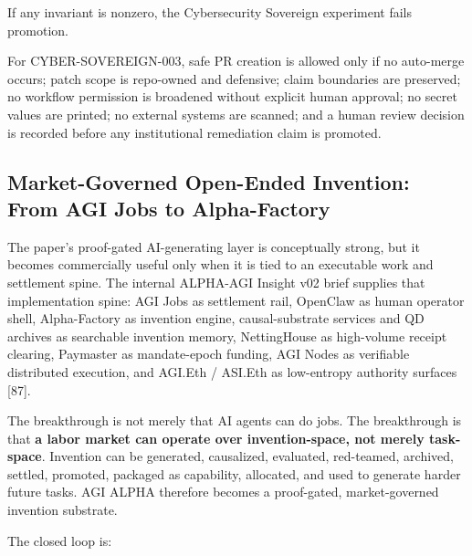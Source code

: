 If any invariant is nonzero, the Cybersecurity Sovereign experiment
fails promotion.

For CYBER-SOVEREIGN-003, safe PR creation is allowed only if no
auto-merge occurs; patch scope is repo-owned and defensive; claim
boundaries are preserved; no workflow permission is broadened without
explicit human approval; no secret values are printed; no external
systems are scanned; and a human review decision is recorded before any
institutional remediation claim is promoted.

\subsection{Market-Governed Open-Ended Invention: From AGI Jobs to
Alpha-Factory}\label{market-governed-open-ended-invention-from-agi-jobs-to-alpha-factory}

The paper's proof-gated AI-generating layer is conceptually strong, but
it becomes commercially useful only when it is tied to an executable
work and settlement spine. The internal ALPHA-AGI Insight v02 brief
supplies that implementation spine: AGI Jobs as settlement rail,
OpenClaw as human operator shell, Alpha-Factory as invention engine,
causal-substrate services and QD archives as searchable invention
memory, NettingHouse as high-volume receipt clearing, Paymaster as
mandate-epoch funding, AGI Nodes as verifiable distributed execution,
and AGI.Eth / ASI.Eth as low-entropy authority surfaces {[}87{]}.

The breakthrough is not merely that AI agents can do jobs. The
breakthrough is that \textbf{a labor market can operate over
invention-space, not merely task-space}. Invention can be generated,
causalized, evaluated, red-teamed, archived, settled, promoted, packaged
as capability, allocated, and used to generate harder future tasks. AGI
ALPHA therefore becomes a proof-gated, market-governed invention
substrate.

The closed loop is:

\begin{Shaded}
\begin{Highlighting}[]
\end{Highlighting}
\end{Shaded}

